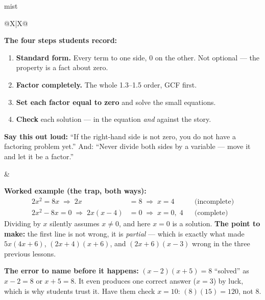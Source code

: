 \documentclass[10pt]{article}
\begin{document}
\boxguard
\begin{skillbox}{mist}
\begin{tabularx}{\linewidth}{@{}X|X@{}}
\begin{minipage}[t]{\linewidth}\vspace{0pt}
\textbf{The four steps students record:}
\begin{enumerate}[leftmargin=1.4em, itemsep=2pt, topsep=2pt]
  \item \textbf{Standard form.} Every term to one side, $0$ on the other. Not optional --- the
        property is a fact about zero.
  \item \textbf{Factor completely.} The whole 1.3--1.5 order, GCF first.
  \item \textbf{Set each factor equal to zero} and solve the small equations.
  \item \textbf{Check} each solution --- in the equation \emph{and} against the story.
\end{enumerate}
\textbf{Say this out loud:} ``If the right-hand side is not zero, you do not have a factoring
problem yet.'' And: ``Never divide both sides by a variable --- move it and let it be a factor.''
\end{minipage}
&
\begin{minipage}[t]{\linewidth}\vspace{0pt}
\textbf{Worked example (the trap, both ways):}
\[
\begin{aligned}
2x^2 = 8x \;\Rightarrow\; 2x &= 8 \;\Rightarrow\; x = 4 && \text{(incomplete)} \\
2x^2-8x = 0 \;\Rightarrow\; 2x(x-4) &= 0 \;\Rightarrow\; x = 0, \; 4 && \text{(complete)}
\end{aligned}
\]
Dividing by $x$ silently assumes $x \ne 0$, and here $x=0$ is a solution. \textbf{The point to make:}
the first line is not wrong, it is \emph{partial} --- which is exactly what made $5x(4x+6)$,
$(2x+4)(x+6)$, and $(2x+6)(x-3)$ wrong in the three previous lessons.

\textbf{The error to name before it happens:} $(x-2)(x+5)=8$ ``solved'' as $x-2=8$ or $x+5=8$. It
even produces one correct answer ($x=3$) by luck, which is why students trust it. Have them check
$x=10$: $(8)(15)=120$, not $8$.
\end{minipage}
\end{tabularx}
\end{skillbox}
\end{document}
